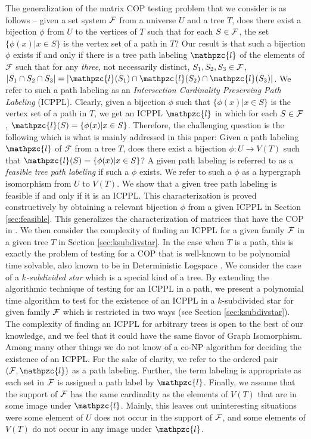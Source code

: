 \documentclass[envcountsect, envcountsame, 11pt]{../lib/llncs2e/llncs}
\def\cF{{\cal F}}
\def\F{{\mathcal F}}
\def\cl{\mathpzc{l}}
\begin{document}
The generalization of the matrix COP testing problem that we consider is  as follows -- given a set system $\cF$
from a universe $U$ and a tree $T$, does there exist a bijection $\phi$ from
$U$ to the vertices of $T$ such that for each $S \in \cF$, the set $\{\phi(x) | x \in S\}$ is
the vertex set of a path in $T$?  
 Our result is that such a bijection $\phi$ exists if and only if
there is a tree path labeling $\cl$ of the elements of $\F$ such that for any  {\em three}, not necessarily distinct, $S_1, S_2, S_3 \in \cF$, $|S_1 \cap S_2 \cap S_3|=|\cl(S_1) \cap \cl(S_2) \cap \cl(S_3)|$.   We refer to such a path labeling as an {\em Intersection Cardinality Preserving
Path Labeling} (ICPPL).   
Clearly, given a bijection $\phi$ such that $\{\phi(x) | x \in S\}$ is
the vertex set of a path in $T$, we get an ICPPL $\cl$ in which for each $S \in \cF$, $\cl(S) = \{\phi(x) | x \in S\}$.  Therefore, the challenging question
is the following which is what is mainly addressed in this paper:  Given a path labeling $\cl$ of $\F$ from a tree $T$, does there exist a bijection 
$\phi:U \rightarrow V(T)$ such that $\cl(S) = \{\phi(x) | x \in S\}$?  A given path labeling is referred to as a {\em feasible tree path labeling} if such a $\phi$
exists.  We refer to such a $\phi$ as a hypergraph isomorphism from $U$ to $V(T)$.  We show that a given tree path labeling is feasible if and only if it is an ICPPL.
This characterization is proved constructively by obtaining a relevant bijection $\phi$ from a given ICPPL in Section \ref{sec:feasible}.  
This generalizes the characterization of matrices that have the COP in \cite{nsnrs09}.  
We then consider the complexity of finding an ICPPL for a given family $\cF$
in a given tree $T$ in Section \ref{sec:ksubdivstar}.    In the case when $T$ is a path, this is exactly the problem of testing for a COP that is well-known to be polynomial time solvable, also known to be in Deterministic Logspace \cite{kklv10}.  We consider the case of a {\em $k$-subdivided star} which is a special kind of a tree.  
By extending the algorithmic technique of testing for an ICPPL in a path, we present a polynomial time algorithm to test for the existence of an ICPPL in a $k$-subdivided star for given family $\cF$ which is restricted in two ways (see Section \ref{sec:ksubdivstar}).
The complexity of finding an ICPPL for arbitrary trees is open to the best of our knowledge, and we feel that it could have the same flavor of Graph Isomorphism. Among many other things we do not know of a co-NP algorithm for deciding the existence of an ICPPL.   For the sake of clarity, we refer to the ordered pair $(\cF,\cl)$ as a path labeling.  Further, the term labeling is appropriate as each set in $\cF$ is assigned a path label by $\cl$.  Finally, we assume that the support of $\cF$ has the same cardinality as the elements of $V(T)$ that are in some image under $\cl$.  Mainly, this leaves out 
uninteresting situations were some element of $U$ does not occur in the support of $\cF$, and some elements of $V(T)$ do not
occur in any image under $\cl$.  
\end{document}
